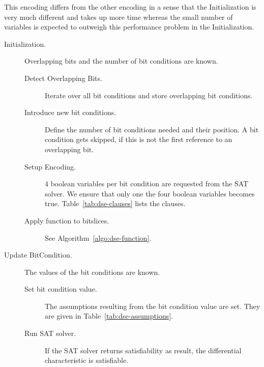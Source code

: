 This encoding differs from the other encoding in a sense that the Initialization is very much different and takes up more time whereas the small number of variables is expected to outweigh this performance problem in the Initialization.
%
\begin{description}
  \item[Initialization.] Overlapping bits and the number of bit conditions are known.
    \begin{description}
      \item[Detect Overlapping Bits.] Iterate over all bit conditions and store overlapping bit conditions.
      \item[Introduce new bit conditions.] Define the number of bit conditions needed and their position. A bit condition gets skipped, if this is not the first reference to an overlapping bit.
      \item[Setup Encoding.] $4$ boolean variables per bit condition are requested from the SAT solver. We ensure that only one the four boolean variables becomes true. Table~\ref{tab:dse-clauses} lists the clauses.
      \item[Apply function to bitslices.] See Algorithm~\ref{algo:dse-function}.
    \end{description}
  \item[Update BitCondition.] The values of the bit conditions are known.
    \begin{description}
      \item[Set bit condition value.] The assumptions resulting from the bit condition value are set. They are given in Table~\ref{tab:dse-assumptions}.
      \item[Run SAT solver.] If the SAT solver returns satisfiability as result, the differential characteristic is satisfiable.
    \end{description}
\end{description}

